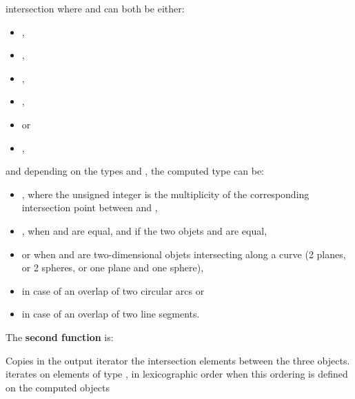 \begin{ccRefFunction}{intersection}
where  and  can both be either:
\begin{itemize}
\item {} ,
\item {} ,
\item {} ,
\item {} ,
\item {}  or
\item {} ,
\end{itemize} 

and depending on the types  and , the computed 
type can be:
\begin{itemize}
\item {} ,
where the unsigned integer is the multiplicity of the corresponding
intersection point between  and ,
\item {} , when  and  are equal, 
and if the two objets  and  are equal,
\item {}  or 
 when  and  
are two-dimensional objets intersecting along a curve (2 planes, or 2
spheres, or one plane and one sphere),
\item {}  in case of an overlap of 
two circular arcs or
\item {}  in case of an overlap of two 
line segments. 
\end{itemize} 

The \textbf{second function} is:

{Copies in the output iterator the intersection elements between the
three objects.  iterates on
elements of type , in lexicographic order 
when this ordering is defined on the computed objects}


\end{ccRefFunction}
